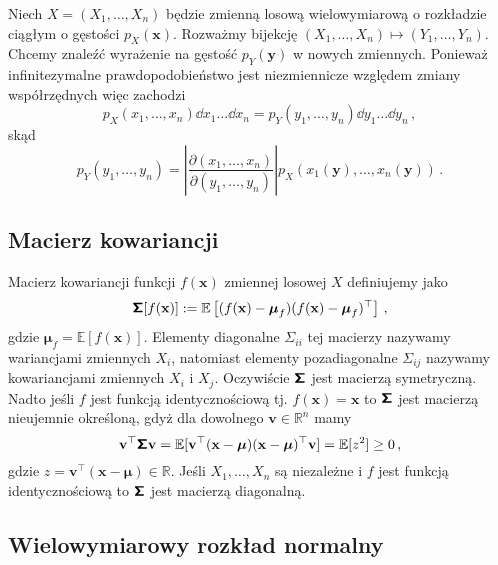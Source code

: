 \documentclass{myclass}
\begin{document}
Niech \(X = (X_1, \ldots, X_n)\) będzie zmienną losową wielowymiarową o rozkładzie ciągłym o
gęstości \(p_X(\mathbf{x})\). Rozważmy bijekcję \((X_1, \ldots, X_n) \mapsto (Y_1, \ldots, Y_n)\).
Chcemy znaleźć wyrażenie na gęstość \(p_Y(\mathbf{y})\) w nowych zmiennych. Ponieważ infinitezymalne
prawdopodobieństwo jest niezmiennicze względem zmiany współrzędnych więc zachodzi
\begin{equation*}
    p_X(x_1,\ldots, x_n)\dd{x_1}\ldots\dd{x_n} = p_Y(y_1,\ldots, y_n)\dd{y_1}\ldots\dd{y_n}\,,
\end{equation*}
skąd
\begin{equation*}
    p_Y(y_1,\ldots,y_n) = \left|\frac{\partial(x_1,\ldots,x_n)}{\partial(y_1,\ldots,y_n)}\right|p_X(x_1(\mathbf{y}),\ldots,x_n(\mathbf{y}))\,.
\end{equation*}

\subsection{Macierz kowariancji}

Macierz kowariancji funkcji \(f(\mathbf{x})\) zmiennej losowej \(X\) definiujemy jako
\begin{equation*}
    \boldsymbol{\mathsf{\Sigma}}[f(\mathbf{x})] := \mathbb{E}\left[(f(\mathbf{x}) - \boldsymbol{\mu}_f)(f(\mathbf{x}) - \boldsymbol{\mu}_f)^\top\right]\,,
\end{equation*}
gdzie \(\boldsymbol{\mu}_f = \mathbb{E}[f(\mathbf{x})]\). Elementy diagonalne
\(\mathsf{\Sigma}_{ii}\) tej macierzy nazywamy wariancjami zmiennych \(X_i\), natomiast elementy
pozadiagonalne \(\mathsf{\Sigma}_{ij}\) nazywamy kowariancjami zmiennych \(X_i\) i \(X_j\).
Oczywiście \(\boldsymbol{\mathsf{\Sigma}}\) jest macierzą symetryczną. Nadto jeśli \(f\) jest funkcją
identycznościową tj. \(f(\mathbf{x}) = \mathbf{x}\) to \(\boldsymbol{\mathsf{\Sigma}}\) jest macierzą nieujemnie
określoną, gdyż dla dowolnego \(\mathbf{v} \in \mathbb{R}^n\) mamy
\begin{equation*}
    \mathbf{v}^\top \boldsymbol{\mathsf{\Sigma}} \mathbf{v} = \mathbb{E}[\mathbf{v}^\top (\mathbf{x} - \boldsymbol{\mu})(\mathbf{x} - \boldsymbol{\mu})^\top \mathbf{v}] = \mathbb{E}[z^2] \geq 0\,,
\end{equation*}
gdzie \(z = \mathbf{v}^\top (\mathbf{x} - \boldsymbol{\mu}) \in \mathbb{R}\). Jeśli \(X_1, \ldots,
X_n\) są niezależne i \(f\) jest funkcją identycznościową to \(\boldsymbol{\mathsf{\Sigma}}\) jest macierzą
diagonalną.

\subsection{Wielowymiarowy rozkład normalny}
\end{document}
